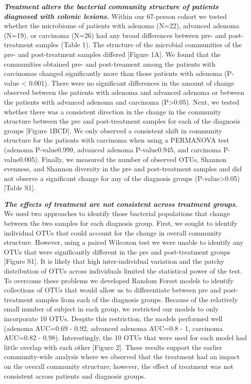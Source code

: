 \documentclass[12pt,]{article}
\begin{document}
\textbf{\emph{Treatment alters the bacterial community structure of
patients diagnosed with colonic lesions.}} Within our 67-person cohort
we tested whether the microbiome of patients with adenoma (N=22),
advanced adenoma (N=19), or carcinoma (N=26) had any broad differences
between pre- and post-treatment samples (Table 1). The structure of the
microbial communities of the pre- and post-treatment samples differed
{[}Figure 1A{]}. We found that the communities obtained pre- and
post-treament among the patients with carcinomas changed significantly
more than those patients with adenoma (P-value \textless{} 0.001). There
were no significant differences in the amount of change observed between
the patients with adenoma and advanced adenoma or between the patients
with advanced adenoma and carcinoma (P\textgreater{}0.05). Next, we
tested whether there was a consistent direction in the change in the
community structure between the pre and post-treatment samples for each
of the diagnosis groups {[}Figure 1BCD{]}. We only observed a consistent
shift in community structure for the patients with carcinoma when using
a PERMANOVA test (adenoma P-value0.999, advanced adenoma P-value0.945,
and carcinoma P-value0.005). Finally, we measured the number of observed
OTUs, Shannon evenness, and Shannon diversity in the pre and
post-treatment samples and did not observe a significant change for any
of the diagnosis groups (P-value\textgreater{}0.05) {[}Table S1{]}.

\textbf{\emph{The effects of treatment are not consistent across
treatment groups.}} We used two approaches to identify those bacterial
populations that change between the two samples for each diagnosis
group. First, we sought to identify individual OTUs that could account
for the change in overall community structure. However, using a paired
Wilcoxon test we were unable to identify any OTUs that were
significantly different in the pre and post-treatment groups {[}Figure
S1{]}. It is likely that high inter-individual variation and the patchy
distribution of OTUs across individuals limited the statistical power of
the test. To overcome these problems we developed Random Forest models
to identify collections of OTUs that would allow us to differentiate
between pre and post-treatment samples from each of the diagnosis
groups. Because of the relatively small number of subject in each group,
we restricted our models to only incorporate 10 OTUs. Despite this
restriction, the models performed well (adenoma AUC=0.69 - 0.92,
advanced adenoma AUC=0.8 - 1, carcinoma AUC=0.82 - 0.98). Interestingly,
the 10 OTUs that were used for each model had little overlap with each
other {[}Figure 2{]}. These results support the earlier community-wide
analysis where we observed that the treatment had an impact on the
overall community structure; however, the effect of treatment was not
consistent across patients and diagnosis groups.
\end{document}
